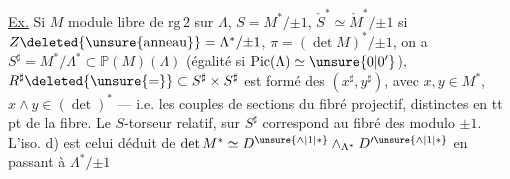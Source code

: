 \uline{Ex.} Si $M$ module libre de $\mathrm{rg}\,2$ sur $\Lambda$, $S=M^*/{\pm1}$, $\check{S}^{*}\simeq\check{M}^{*}/{\pm1}$ si $Z\deleted{\unsure{\mathrm{anneau}}}=\Lambda^*/{\pm1}$,  $\pi=(\det M)^{*}/{\pm1}$, on a $S^\sharp=M^*/\Lambda^*\subset\mathbb{P}(M)(\Lambda)$ (égalité si $\mathrm{Pic}(\Lambda)\simeq\unsure{0|0'}$), $R^\sharp\deleted{\unsure{=}}\subset S^\sharp\times S^\sharp$ est formé des   $(x^\sharp,y^\sharp)$, avec $x,y\in M^*$, $x\wedge y\in(\det)^{*}$ --- i.e. les couples de sections du fibré projectif, distinctes en tt pt de la fibre. Le $S$-torseur relatif, sur  $S^\sharp$ correspond au fibré des  modulo $\pm1$. L'iso.  d) est celui déduit de $\det M^*\simeq D^{\unsure{\wedge|1|*}}\mathbin{\wedge}_{\Lambda^*}D'^{\unsure{\wedge|1|*}}$ en passant à $\Lambda^*/{\pm1}$


